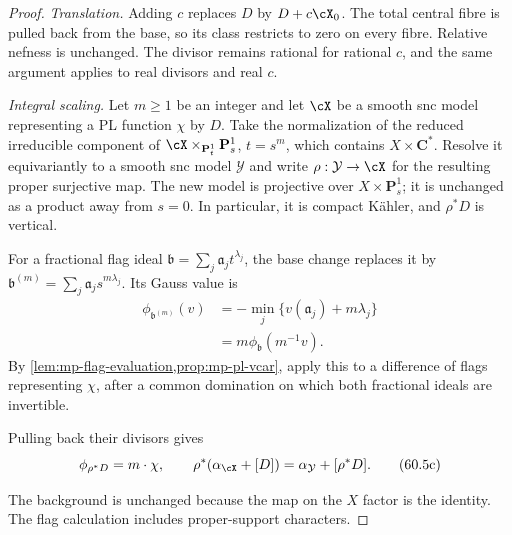 \begin{proof}
\emph{Translation.}
Adding $c$ replaces $D$ by $D+c\cX_0$.
The total central fibre is pulled back from the base, so its
class restricts to zero on every fibre. Relative nefness is unchanged.
The divisor remains rational for rational $c$, and the same argument
applies to real divisors and real $c$.

\emph{Integral scaling.}
Let $m\geq1$ be an integer and let $\cX$ be a smooth snc model
representing a PL function $\chi$ by $D$.
Take the normalization of the reduced irreducible component of
$\cX\times_{\mathbf P^1_t}\mathbf P^1_s$, $t=s^m$,
which contains $X\times\mathbf C^*$. Resolve it equivariantly
to a smooth snc model $\mathcal Y$ and write
$\rho:\mathcal Y\to\cX$ for the resulting proper surjective map.
The new model is projective over $X\times\mathbf P^1_s$;
it is unchanged as a product away from $s=0$.
In particular, it is compact K\"ahler, and $\rho^*D$ is vertical.

For a fractional flag ideal $\mathfrak b=\sum_j\mathfrak a_jt^{\lambda_j}$,
the base change replaces it by
$\mathfrak b^{(m)}=\sum_j\mathfrak a_js^{m\lambda_j}$.
Its Gauss value is
\[
 \begin{aligned}
 \phi_{\mathfrak b^{(m)}}(v)
   &=-\min_j\{v(\mathfrak a_j)+m\lambda_j\}\\
   &=m\phi_{\mathfrak b}(m^{-1}v).
 \end{aligned}
\]
By \cref{lem:mp-flag-evaluation,prop:mp-pl-vcar}, apply this to
a difference of flags representing $\chi$, after a common domination
on which both fractional ideals are invertible.

\noindent\begin{minipage}{\linewidth}
Pulling back their divisors gives
\[
 \phi_{\rho^*D}=m\cdot\chi,
 \qquad
 \rho^*(\alpha_{\cX}+[D])
       =\alpha_{\mathcal Y}+[\rho^*D].
\tag{60.5c}\label{eq:mp-base-change-model-potential}
\]
\end{minipage}\par\smallskip
The background is unchanged because the map on the $X$ factor is the
identity. The flag calculation includes proper-support characters.


\end{proof}
